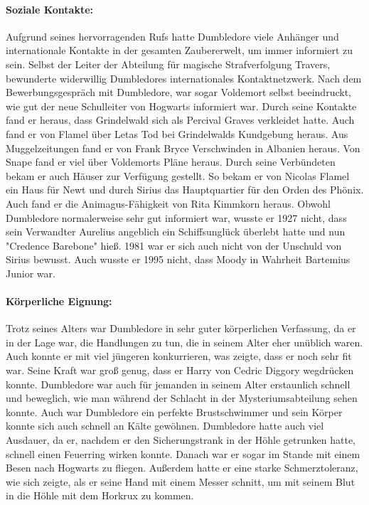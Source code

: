 \documentclass[a4paper, 10pt]{article}
\begin{document}
\paragraph{Soziale Kontakte:}
Aufgrund seines hervorragenden Rufs hatte Dumbledore viele Anhänger und internationale Kontakte in der gesamten Zaubererwelt, um immer informiert zu sein. Selbst der Leiter der Abteilung für magische Strafverfolgung Travers, bewunderte widerwillig Dumbledores internationales Kontaktnetzwerk. Nach dem Bewerbungsgespräch mit Dumbledore, war sogar Voldemort selbst beeindruckt, wie gut der neue Schulleiter von Hogwarts informiert war. Durch seine Kontakte fand er heraus, dass Grindelwald sich als Percival Graves verkleidet hatte. Auch fand er von Flamel über Letas Tod bei Grindelwalds Kundgebung heraus. Aus Muggelzeitungen fand er von Frank Bryce Verschwinden in Albanien heraus. Von Snape fand er viel über Voldemorts Pläne heraus. Durch seine Verbündeten bekam er auch Häuser zur Verfügung gestellt. So bekam er von Nicolas Flamel ein Haus für Newt und durch Sirius das Hauptquartier für den Orden des Phönix. Auch fand er die Animagus-Fähigkeit von Rita Kimmkorn heraus. Obwohl Dumbledore normalerweise sehr gut informiert war, wusste er 1927 nicht, dass sein Verwandter Aurelius angeblich ein Schiffsunglück überlebt hatte und nun "Credence Barebone" hieß. 1981 war er sich auch nicht von der Unschuld von Sirius bewusst. Auch wusste er 1995 nicht, dass Moody in Wahrheit Bartemius Junior war.

\paragraph{Körperliche Eignung:}
Trotz seines Alters war Dumbledore in sehr guter körperlichen Verfassung, da er in der Lage war, die Handlungen zu tun, die in seinem Alter eher unüblich waren. Auch konnte er mit viel jüngeren konkurrieren, was zeigte, dass er noch sehr fit war. Seine Kraft war groß genug, dass er Harry von Cedric Diggory wegdrücken konnte. Dumbledore war auch für jemanden in seinem Alter erstaunlich schnell und beweglich, wie man während der Schlacht in der Mysteriumsabteilung sehen konnte. Auch war Dumbledore ein perfekte Brustschwimmer und sein Körper konnte sich auch schnell an Kälte gewöhnen. Dumbledore hatte auch viel Ausdauer, da er, nachdem er den Sicherungstrank in der Höhle getrunken hatte, schnell einen Feuerring wirken konnte. Danach war er sogar im Stande mit einem Besen nach Hogwarts zu fliegen. Außerdem hatte er eine starke Schmerztoleranz, wie sich zeigte, als er seine Hand mit einem Messer schnitt, um mit seinem Blut in die Höhle mit dem Horkrux zu kommen.
\end{document}
